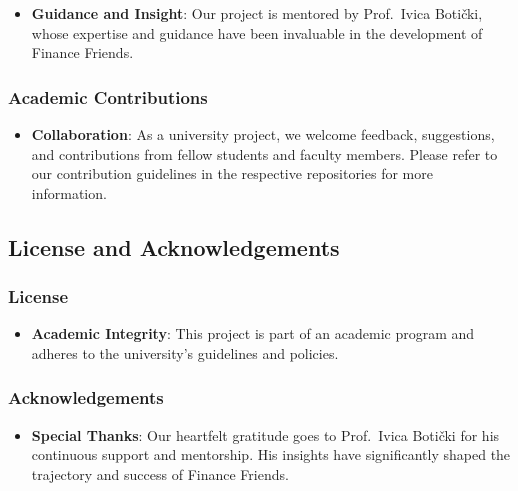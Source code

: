 \begin{itemize}
\tightlist
\item
  \textbf{Guidance and Insight}: Our project is mentored by Prof.~Ivica
  Botički, whose expertise and guidance have been invaluable in the
  development of Finance Friends.
\end{itemize}

\hypertarget{academic-contributions}{%
\subsubsection{Academic Contributions}\label{academic-contributions}}

\begin{itemize}
\tightlist
\item
  \textbf{Collaboration}: As a university project, we welcome feedback,
  suggestions, and contributions from fellow students and faculty
  members. Please refer to our contribution guidelines in the respective
  repositories for more information.
\end{itemize}

\hypertarget{license-and-acknowledgements}{%
\subsection{License and
Acknowledgements}\label{license-and-acknowledgements}}

\hypertarget{license}{%
\subsubsection{License}\label{license}}

\begin{itemize}
\tightlist
\item
  \textbf{Academic Integrity}: This project is part of an academic
  program and adheres to the university's guidelines and policies.
\end{itemize}

\hypertarget{acknowledgements}{%
\subsubsection{Acknowledgements}\label{acknowledgements}}

\begin{itemize}
\tightlist
\item
  \textbf{Special Thanks}: Our heartfelt gratitude goes to Prof.~Ivica
  Botički for his continuous support and mentorship. His insights have
  significantly shaped the trajectory and success of Finance Friends.
\end{itemize}
